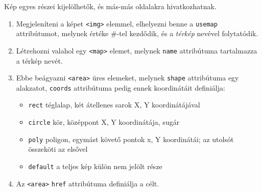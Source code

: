 \documentclass[usenames,dvipsnames,aspectratio=169]{beamer}
\begin{document}
\begin{frame}
  Kép egyes részei kijelölhetők, és más-más oldalakra hivatkozhatnak.
  \begin{enumerate}
    \item Megjeleníteni a képet \texttt{<img>} elemmel, elhelyezni benne a \texttt{usemap} attribútumot, melynek értéke \#-tel kezdődik, és a \emph{térkép} nevével folytatódik.
    \item Létrehozni valahol egy \texttt{<map>} elemet, melynek \texttt{name} attribútuma tartalmazza a térkép nevét.
    \item Ebbe beágyazni \texttt{<area>} üres elemeket, melynek \texttt{shape} attribútuma egy alakzatot, \texttt{coords} attribútuma pedig ennek koordinátáit definiálja:
    \begin{itemize}
      \item \texttt{rect} téglalap, két átellenes sarok X, Y koordinátájával
      \item \texttt{circle} kör, középpont X, Y koordinátája, sugár
      \item \texttt{poly} poligon, egymást követő pontok x, Y koordinátái; az utolsót összeköti az elsővel
      \item \texttt{default} a teljes kép külön nem jelölt része
    \end{itemize}
    \item Az \texttt{<area>} \texttt{href} attribútuma definiálja a célt.
  \end{enumerate}
\end{frame}
\end{document}
